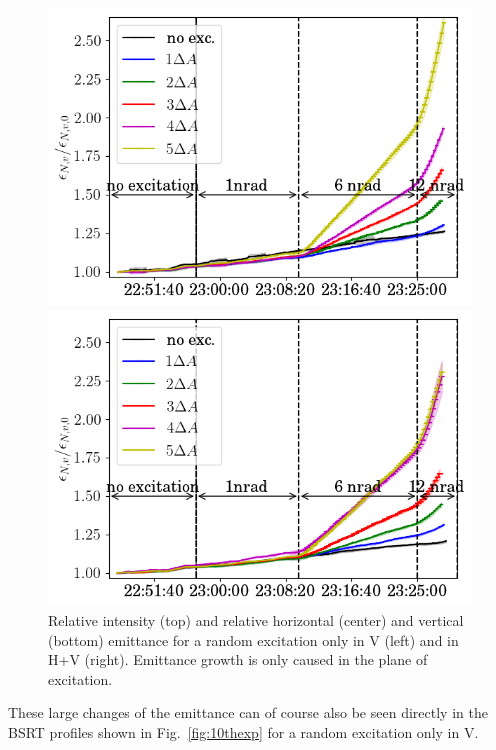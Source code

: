 \documentclass[%
 reprint,
 amsmath,amssymb,
 aps,
prstab,
]{revtex4-1}
\begin{document}
\begin{figure}[h]
\begin{minipage}[t]{0.49\linewidth}
		\includegraphics[width=1.0\linewidth]{2017_emitv_avg_rel_vran_no_damper.png}
	\end{minipage}	
	\begin{minipage}[t]{0.49\linewidth}
		\centering
		\includegraphics[width=1.0\linewidth]{2017_emitv_avg_rel_hvran_no_damper.png}
	\end{minipage}	
	\caption{\label{fig:ranexp} Relative intensity (top) and relative horizontal (center) and vertical (bottom) emittance for a random excitation only in V (left) and in H+V (right). Emittance growth is only caused in the plane of excitation.}
\end{figure}
These large changes of the emittance can of course also be seen directly in the BSRT profiles shown in Fig.~\ref{fig:10thexp} for a random excitation only in V.
\end{document}
